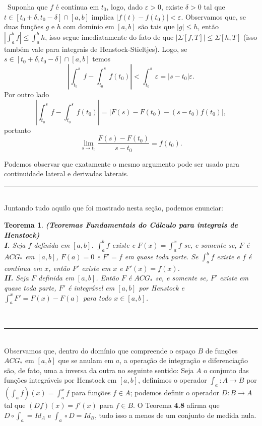 \documentclass[12pt, a4paper]{article}
\newtheorem{thrm}[mydef]{Teorema}
\def\dem{\par\smallbreak\noindent {\textit{ Demonstração:}} \ }
\def\eop{\hfill\rule{2.5mm}{2.5mm}}
\theoremstyle{definition}
\begin{document}
\dem Suponha que $f$ é contínua em $t_0$, logo, dado $\varepsilon >0$, existe $\delta >0$ tal que $t\in [t_0+\delta , t_0-\delta]\cap [a,b]$ implica $|f(t)-f(t_0)|<\varepsilon$. Observamos que, se duas funções $g$ e $h$ com domínio em $[a,b]$ são tais que $|g|\leq h$, então $|\int_a^b f|\leq \int_a^b h $, isso segue imediatamente do fato de que $|\Sigma[f,T]|\leq \Sigma [h,T]$ (isso também vale para integrais de Henstock-Stieltjes). Logo, se $s\in [t_0+\delta , t_0-\delta]\cap [a,b]$ temos $$\left|\int_{t_0}^s f-\int_{t_0}^s f(t_0)\right|<\int_{t_0}^s \varepsilon=|s-t_0|\varepsilon.$$ Por outro lado $$\left|\int_{t_0}^s f-\int_{t_0}^s f(t_0)\right|=\left|F(s)-F(t_0)-(s-t_0) f(t_0)\right|,$$ portanto $$\lim_{s\rightarrow t_0}\frac{F(s)-F(t_0)}{s-t_0}=f(t_0). $$

Podemos observar que exatamente o mesmo argumento pode ser usado para continuidade lateral e derivadas laterais. \eop \\

Juntando tudo aquilo que foi mostrado nesta seção, podemos enunciar: 

\begin{thrm}
	
	\textbf{(Teoremas Fundamentais do Cálculo para integrais de Henstock)} \\
	
	\textbf{I.} Seja $f$ definida em $[a,b]$. $\int_a^b f$ existe e $F(x)=\int_a^x f$ se, e somente se, $F$ é $ACG_*$ em $[a,b]$, $F(a)=0$ e $F'=f$ em quase toda parte. Se $\int_a^b f$ existe e $f$ é contínua em $x$, então $F'$ existe em $x$ e $F'(x)=f(x)$. \\
	
	\textbf{II.} Seja $F$ definida em $[a,b]$. Então $F$ é $ACG_*$ se, e somente se, $F'$ existe em quase toda parte, $F'$ é integrável em $[a,b]$ por Henstock e $\int_a^x F'=F(x)-F(a)$ para todo $x\in[a,b]$. 
	
\end{thrm} 

\ \eop \\

Observamos que, dentro do domínio que compreende o espaço $B$ de funções $ACG_*$ em $[a,b]$ que se anulam em $a$, a operação de integração e diferenciação são, de fato, uma a inversa da outra no seguinte sentido: Seja $A$ o conjunto das funções integráveis por Henstock em $[a,b]$, definimos o operador $\int_a: A\rightarrow B$ por $(\int_a f)(x)=\int_a^x f$ para funções $f\in A$; podemos definir o operador $D: B\rightarrow A$ tal que $(Df)(x)=f'(x)$ para $f\in B$. O Teorema \textbf{4.8} afirma que $D\circ \int_a = Id_A$ e $\int_a\circ D = Id_B$, tudo isso a menos de um conjunto de medida nula. 
\end{document}
